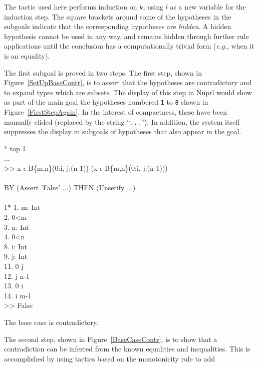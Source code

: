 The tactic used here performs induction on $k$, using $l$ as a new variable for
the induction step.  The square brackets around some of the hypotheses in the
subgoals indicate that the corresponding hypotheses are {\em hidden}.  A
hidden hypothesis cannot be used in any way, and remains hidden through
further rule applications until the conclusion has a computationally trivial
form ({\em e.g.}, when it is an equality).

The first subgoal is proved in two steps.  The first step, shown in 
Figure~\ref{SetUpBaseContr}, is to
assert that
the hypotheses are contradictory and to expand types which are subsets.  
The display of this step in Nuprl
would show as part of the main goal the hypotheses numbered {\tt 1} to {\tt 8}
shown in Figure~\ref{FirstStepAgain}. In
the interest of compactness, these have been manually elided (replaced by
the string ``{\tt{}...}'').  
In addition, the system itself suppresses the display in subgoals
of hypotheses that also appear in the goal.
\begin{RuledFigure}
\begin{Screen}{1}{\SnapshotSize}
\N{}* top 1 \\{}
\N{}... \\{}
\N{}>> x \(\epsilon{}\) B\{m,n\}(0:i, j:(n-1))  \mvee{}  \mneg{}(x \(\epsilon{}\) B\{m,n\}(0:i, j:(n-1))) \\{}
\N{} \\{}
\N{}BY (Assert 'False' ...) THEN (Unsetify ...) \\{}
\N{}     \\{}
\N{}1* 1. m: Int \\{}
\N{}   2. 0<m \\{}
\N{}   3. n: Int \\{}
\N{}   4. 0<n \\{}
\N{}   8. i: Int \\{}
\N{}   9. j: Int \\{}
\N{}   11. 0 \mleq{} j \\{}
\N{}   12. j \mleq{} n-1 \\{}
\N{}   13. 0 \mleq{} i \\{}
\N{}   14. i \mleq{} m-1 \\{}
\N{}   >> False    
\end{Screen}%
\caption{The base case is contradictory.}
\label{SetUpBaseContr} 
\end{RuledFigure}
The second step, shown in Figure~\ref{BaseCaseContr}, is to show that a
contradiction can be inferred from the known equalities and inequalities.
This is accomplished by using tactics based on the monotonicity rule to add
